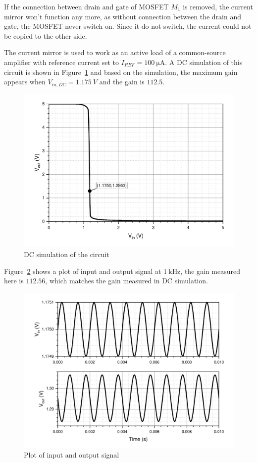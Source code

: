 \documentclass[12pt]{article}   %
\begin{document}
	If the connection between drain and gate of MOSFET $M_1$ is removed, the current mirror won't function any more, as without connection between the drain and gate, the MOSFET never switch on. Since it do not switch, the current could not be copied to the other side.
	
	The current mirror is used to work as an active load of a common-source amplifier with reference current set to $I_{REF} = \SI{100}{\micro\ampere}$. A DC simulation of this circuit is shown in Figure~\ref{fig:mixedAmpDc} and based on the simulation, the maximum gain appears when $V_{in,DC} = \SI{1.175}{V}$ and the gain is $112.5$.
	
	\begin{figure}[htbp]
		\centering
		\includegraphics[width=0.7\linewidth]{Figures/E3_Current_Mirror/mixed_amp_dc}
		\caption{DC simulation of the circuit}
		\label{fig:mixedAmpDc}
	\end{figure}
	
	Figure~\ref{fig:mixedAmpTran} shows a plot of input and output signal at $\SI{1}{\kilo\hertz}$, the gain measured here is $112.56$, which matches the gain measured in DC simulation.
	
	\begin{figure}[htbp]
		\centering
		\includegraphics[width=0.7\linewidth]{Figures/E3_Current_Mirror/mixed_amp_tran}
		\caption{Plot of input and output signal}
		\label{fig:mixedAmpTran}
	\end{figure}
	
\end{document}
